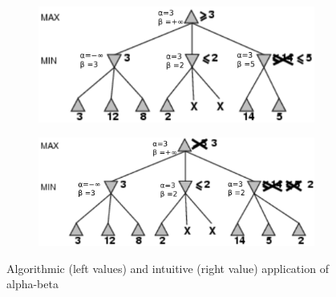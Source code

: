 \begin{figure}[h]
\begin{subfigure}{.4\textwidth}
    \end{subfigure}
    \begin{subfigure}{.4\textwidth}
        \centering
        \includegraphics[width=\linewidth]{img/alphabeta_algo_example4.png}
    \end{subfigure}
    \begin{subfigure}{.4\textwidth}
        \centering
        \includegraphics[width=\linewidth]{img/alphabeta_algo_example5.png}
    \end{subfigure}
    \caption{Algorithmic (left values) and intuitive (right value) application of alpha-beta}
\end{figure}